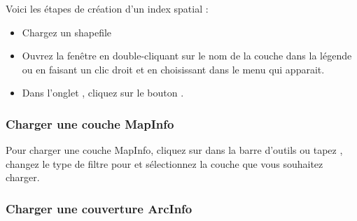 Voici les étapes de création d'un index spatial :

\begin{itemize}
\item Chargez un shapefile
\item Ouvrez la fenêtre  en double-cliquant sur le nom de la couche dans la légende ou en faisant un clic droit et en choisissant  dans le menu qui apparait.
\item Dans l'onglet , cliquez sur le bouton .
\end{itemize}

\subsubsection{Charger une couche MapInfo}

Pour charger une couche MapInfo, cliquez sur  dans la barre d'outils ou tapez , changez le type de filtre pour  et sélectionnez la couche que vous souhaitez charger.

\subsubsection{Charger une couverture ArcInfo}


